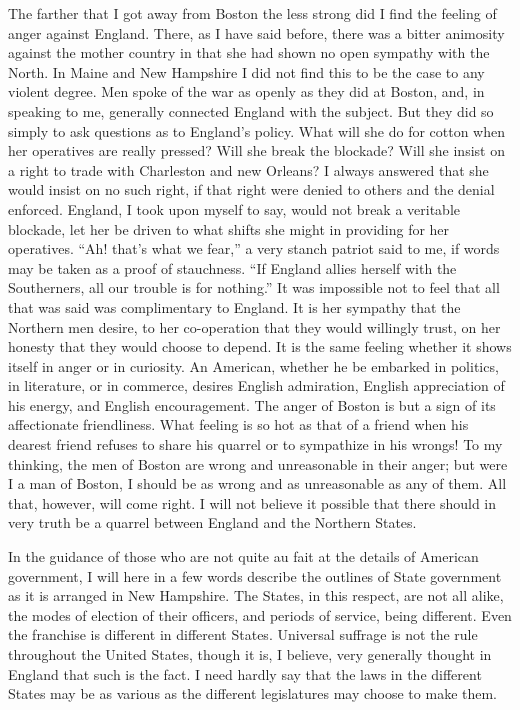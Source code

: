 The farther that I got away from Boston the less strong did I find
the feeling of anger against England.  There, as I have said
before, there was a bitter animosity against the mother country in
that she had shown no open sympathy with the North.  In Maine and
New Hampshire I did not find this to be the case to any violent
degree.  Men spoke of the war as openly as they did at Boston, and,
in speaking to me, generally connected England with the subject.
But they did so simply to ask questions as to England's policy.
What will she do for cotton when her operatives are really pressed?
Will she break the blockade?  Will she insist on a right to trade
with Charleston and new Orleans?  I always answered that she would
insist on no such right, if that right were denied to others and
the denial enforced.  England, I took upon myself to say, would not
break a veritable blockade, let her be driven to what shifts she
might in providing for her operatives.  ``Ah! that's what we fear,''
a very stanch patriot said to me, if words may be taken as a proof
of stauchness.  ``If England allies herself with the Southerners,
all our trouble is for nothing.''  It was impossible not to feel
that all that was said was complimentary to England.  It is her
sympathy that the Northern men desire, to her co-operation that
they would willingly trust, on her honesty that they would choose
to depend.  It is the same feeling whether it shows itself in anger
or in curiosity.  An American, whether he be embarked in politics,
in literature, or in commerce, desires English admiration, English
appreciation of his energy, and English encouragement.  The anger
of Boston is but a sign of its affectionate friendliness.  What
feeling is so hot as that of a friend when his dearest friend
refuses to share his quarrel or to sympathize in his wrongs!  To my
thinking, the men of Boston are wrong and unreasonable in their
anger; but were I a man of Boston, I should be as wrong and as
unreasonable as any of them.  All that, however, will come right.
I will not believe it possible that there should in very truth be a
quarrel between England and the Northern States.

In the guidance of those who are not quite au fait at the details
of American government, I will here in a few words describe the
outlines of State government as it is arranged in New Hampshire.
The States, in this respect, are not all alike, the modes of
election of their officers, and periods of service, being
different.  Even the franchise is different in different States.
Universal suffrage is not the rule throughout the United States,
though it is, I believe, very generally thought in England that
such is the fact.  I need hardly say that the laws in the different
States may be as various as the different legislatures may choose
to make them.

